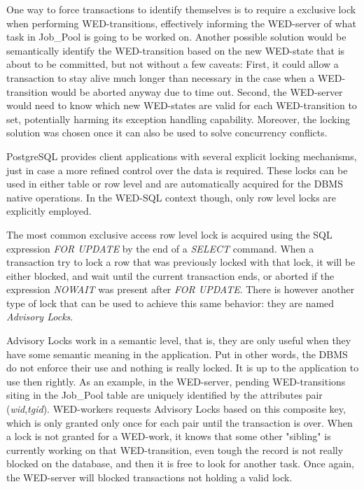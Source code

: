 \documentclass[conference]{IEEEtran}
\begin{document}
\par One way to force transactions to identify themselves is to require a exclusive lock when performing WED-transitions,
effectively informing the WED-server of what task in Job\_Pool is going to be worked on. Another possible solution would
be semantically identify the WED-transition based on the new WED-state that is about to be committed, but not without a 
few caveats: First, it could allow a transaction to stay alive much longer than necessary in the case when a WED-transition
would be aborted anyway due to time out. Second, the WED-server would need to know which new WED-states are valid for each
WED-transition to set, potentially harming its exception handling capability. Moreover, the locking solution was chosen 
once it can also be used to solve concurrency conflicts.    

\par PostgreSQL provides client applications with several explicit locking mechanisms, just in case a more refined control
over the data is required. These locks can be used in either table or row level and are automatically acquired for the DBMS
native operations. In the WED-SQL context though, only row level locks are explicitly employed.  

\par The most common exclusive access row level lock is acquired using the SQL expression \emph{FOR UPDATE} by the end of
a \emph{SELECT} command. When a transaction try to lock a row that was previously locked with that lock, it will be either blocked,
and wait until the current transaction ends, or aborted if the expression \emph{NOWAIT} was present after \emph{FOR UPDATE}.
There is however another type of lock that can be used to achieve this same behavior: they are named \emph{Advisory Locks}.

\par Advisory Locks work in a semantic level, that is, they are only useful when they have some semantic meaning in the 
application. Put in other words, the DBMS do not enforce their use and nothing is really locked. It is up to the application
to use then rightly. As an example, in the WED-server, pending WED-transitions siting in the Job\_Pool table are uniquely
identified by the attributes pair (\emph{wid},\emph{tgid}). WED-workers requests Advisory Locks based on this composite key, 
which is only granted only once for each pair until the transaction is over. When a lock is not granted for a WED-work, it
knows that some other "sibling" is currently working on that WED-transition, even tough the record is not really blocked
on the database, and then it is free to look for another task. Once again, the WED-server will blocked transactions not
holding a valid lock. 
 
\end{document}
